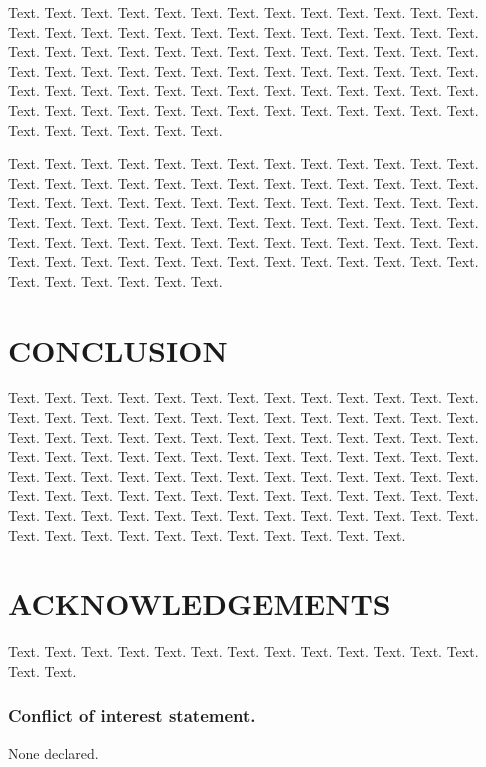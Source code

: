\documentclass[a4,center,fleqn]{NAR}
\begin{document}
Text. Text. Text. Text. Text. Text. Text. Text. Text. Text. Text.
Text. Text. Text. Text. Text. Text. Text. Text. Text. Text. Text.
Text. Text. Text. Text. Text. Text. Text. Text. Text. Text. Text.
Text. Text. Text. Text. Text. Text. Text. Text. Text. Text. Text.
Text. Text. Text. Text. Text. Text. Text. Text. Text. Text. Text.
Text. Text. Text. Text. Text. Text. Text. Text. Text. Text. Text.
Text. Text. Text. Text. Text. Text. Text. Text. Text. Text. Text.
Text. Text. Text. Text. Text. Text. Text.

Text. Text. Text. Text. Text. Text. Text. Text. Text. Text. Text.
Text. Text. Text. Text. Text. Text. Text. Text. Text. Text. Text.
Text. Text. Text. Text. Text. Text. Text. Text. Text. Text. Text.
Text. Text. Text. Text. Text. Text. Text. Text. Text. Text. Text.
Text. Text. Text. Text. Text. Text. Text. Text. Text. Text. Text.
Text. Text. Text. Text. Text. Text. Text. Text. Text. Text. Text.
Text. Text. Text. Text. Text. Text. Text. Text. Text. Text. Text.
Text. Text. Text. Text. Text. Text. Text.


\section{CONCLUSION}

Text. Text. Text. Text. Text. Text. Text. Text. Text. Text. Text.
Text. Text. Text. Text. Text. Text. Text. Text. Text. Text. Text.
Text. Text. Text. Text. Text. Text. Text. Text. Text. Text. Text.
Text. Text. Text. Text. Text. Text. Text. Text. Text. Text. Text.
Text. Text. Text. Text. Text. Text. Text. Text. Text. Text. Text.
Text. Text. Text. Text. Text. Text. Text. Text. Text. Text. Text.
Text. Text. Text. Text. Text. Text. Text. Text. Text. Text. Text.
Text. Text. Text. Text. Text. Text. Text. Text. Text. Text. Text.
Text. Text. Text. Text. Text. Text. Text. Text. Text. Text. Text.
Text. Text. Text.


\section{ACKNOWLEDGEMENTS}

Text. Text. Text. Text. Text. Text. Text. Text. Text. Text. Text.
Text. Text. Text. Text.


\subsubsection{Conflict of interest statement.} None declared.
\newpage
\end{document}
